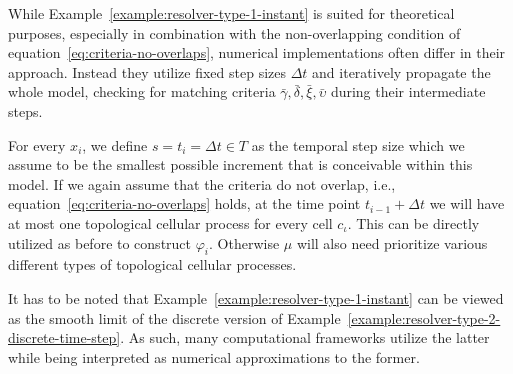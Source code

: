 While Example~\ref{example:resolver-type-1-instant} is suited for theoretical purposes, especially
in combination with the non-overlapping condition of equation~\eqref{eq:criteria-no-overlaps},
numerical implementations often differ in their approach.
Instead they utilize fixed step sizes $\Delta t$ and iteratively propagate the whole model, checking
for matching criteria $\bar{\gamma},\bar{\delta},\bar{\xi},\bar{\upsilon}$ during their intermediate
steps.

\begin{example}
    For every $x_i$, we define $s=t_i=\Delta t\in T$ as the temporal step size which we assume to be
    the smallest possible increment that is conceivable within this model.
    If we again assume that the criteria do not overlap, i.e.,
    equation~\eqref{eq:criteria-no-overlaps} holds, at the time point $t_{i-1}+\Delta t$ we will
    have at most one topological cellular process for every cell $c_\iota$.
    This can be directly utilized as before to construct $\varphi_i$.
    Otherwise $\mu$ will also need prioritize various different types of topological cellular
    processes.
    \label{example:resolver-type-2-discrete-time-step}
\end{example}

It has to be noted that Example~\ref{example:resolver-type-1-instant} can be viewed as the smooth
limit of the discrete version of Example~\ref{example:resolver-type-2-discrete-time-step}.
As such, many computational frameworks utilize the latter while being interpreted as numerical
approximations to the former.

